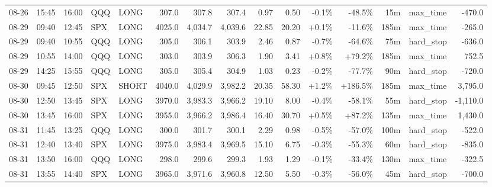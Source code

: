 \documentclass[11pt,a4paper,twoside]{article}
\begin{document}
\begin{landscape}
\begin{center}
\begin{longtable}{>{\color{txtmain}}l l l l l r r r r r r r r >{\color{txtmain}}l r}
08-26 & 15:45 & 16:00 & QQQ & LONG & 307.0 & 307.8 & 307.4 & 0.97 & 0.50 & \textcolor{lossred}{-0.1\%} & \textcolor{lossred}{-48.5\%} & 15m & max\_time & \textcolor{lossred}{-470.0} \\
08-29 & 09:40 & 12:45 & SPX & LONG & 4025.0 & 4,034.7 & 4,039.6 & 22.85 & 20.20 & \textcolor{wingreen}{+0.1\%} & \textcolor{lossred}{-11.6\%} & 185m & max\_time & \textcolor{lossred}{-265.0} \\
08-29 & 09:40 & 10:55 & QQQ & LONG & 305.0 & 306.1 & 303.9 & 2.46 & 0.87 & \textcolor{lossred}{-0.7\%} & \textcolor{lossred}{-64.6\%} & 75m & hard\_stop & \textcolor{lossred}{-636.0} \\
08-29 & 10:55 & 14:00 & QQQ & LONG & 303.0 & 303.9 & 306.3 & 1.90 & 3.41 & \textcolor{wingreen}{+0.8\%} & \textcolor{wingreen}{+79.2\%} & 185m & max\_time & \textcolor{wingreen}{752.5} \\
08-29 & 14:25 & 15:55 & QQQ & LONG & 305.0 & 305.4 & 304.9 & 1.03 & 0.23 & \textcolor{lossred}{-0.2\%} & \textcolor{lossred}{-77.7\%} & 90m & hard\_stop & \textcolor{lossred}{-720.0} \\
08-30 & 09:45 & 12:50 & SPX & SHORT & 4040.0 & 4,029.9 & 3,982.2 & 20.35 & 58.30 & \textcolor{wingreen}{+1.2\%} & \textcolor{wingreen}{+186.5\%} & 185m & max\_time & \textcolor{wingreen}{3,795.0} \\
08-30 & 12:50 & 13:45 & SPX & LONG & 3970.0 & 3,983.3 & 3,966.2 & 19.10 & 8.00 & \textcolor{lossred}{-0.4\%} & \textcolor{lossred}{-58.1\%} & 55m & hard\_stop & \textcolor{lossred}{-1,110.0} \\
08-30 & 13:45 & 16:00 & SPX & LONG & 3955.0 & 3,966.2 & 3,986.4 & 16.40 & 30.70 & \textcolor{wingreen}{+0.5\%} & \textcolor{wingreen}{+87.2\%} & 135m & max\_time & \textcolor{wingreen}{1,430.0} \\
08-31 & 11:45 & 13:25 & QQQ & LONG & 300.0 & 301.7 & 300.1 & 2.29 & 0.98 & \textcolor{lossred}{-0.5\%} & \textcolor{lossred}{-57.0\%} & 100m & hard\_stop & \textcolor{lossred}{-522.0} \\
08-31 & 12:40 & 13:40 & SPX & LONG & 3975.0 & 3,983.4 & 3,969.5 & 15.10 & 6.75 & \textcolor{lossred}{-0.3\%} & \textcolor{lossred}{-55.3\%} & 60m & hard\_stop & \textcolor{lossred}{-835.0} \\
08-31 & 13:50 & 16:00 & QQQ & LONG & 298.0 & 299.6 & 299.3 & 1.93 & 1.29 & \textcolor{lossred}{-0.1\%} & \textcolor{lossred}{-33.4\%} & 130m & max\_time & \textcolor{lossred}{-322.5} \\
08-31 & 13:55 & 14:40 & SPX & LONG & 3965.0 & 3,971.6 & 3,960.8 & 12.50 & 5.50 & \textcolor{lossred}{-0.3\%} & \textcolor{lossred}{-56.0\%} & 45m & hard\_stop & \textcolor{lossred}{-700.0} \\

\end{longtable}
\end{center}
\end{landscape}
\end{document}

